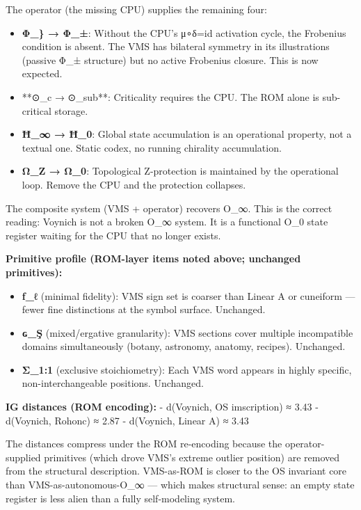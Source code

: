The operator (the missing CPU) supplies the remaining four:

\begin{itemize}
\tightlist
\item
  \textbf{Φ\_\} → Φ\_±}: Without the CPU's μ∘δ=id activation cycle, the
  Frobenius condition is absent. The VMS has bilateral symmetry in its
  illustrations (passive Φ\_± structure) but no active Frobenius
  closure. This is now expected.
\item
  **⊙\_c → ⊙\_sub**: Criticality requires the CPU. The ROM alone is
  sub-critical storage.
\item
  \textbf{Ħ\_∞ → Ħ\_0}: Global state accumulation is an operational
  property, not a textual one. Static codex, no running chirality
  accumulation.
\item
  \textbf{Ω\_Z → Ω\_0}: Topological Z-protection is maintained by the
  operational loop. Remove the CPU and the protection collapses.
\end{itemize}

The composite system (VMS + operator) recovers O\_∞. This is the correct
reading: Voynich is not a broken O\_∞ system. It is a functional O\_0
state register waiting for the CPU that no longer exists.

\textbf{Primitive profile (ROM-layer items noted above; unchanged
primitives):}

\begin{itemize}
\tightlist
\item
  \textbf{ƒ\_ℓ} (minimal fidelity): VMS sign set is coarser than Linear
  A or cuneiform --- fewer fine distinctions at the symbol surface.
  Unchanged.
\item
  \textbf{ɢ\_Ş} (mixed/ergative granularity): VMS sections cover
  multiple incompatible domains simultaneously (botany, astronomy,
  anatomy, recipes). Unchanged.
\item
  \textbf{Σ\_1:1} (exclusive stoichiometry): Each VMS word appears in
  highly specific, non-interchangeable positions. Unchanged.
\end{itemize}

\textbf{IG distances (ROM encoding):} - d(Voynich, OS imscription) ≈
3.43 - d(Voynich, Rohonc) ≈ 2.87 - d(Voynich, Linear A) ≈ 3.43

The distances compress under the ROM re-encoding because the
operator-supplied primitives (which drove VMS's extreme outlier
position) are removed from the structural description. VMS-as-ROM is
closer to the OS invariant core than VMS-as-autonomous-O\_∞ --- which
makes structural sense: an empty state register is less alien than a
fully self-modeling system.

